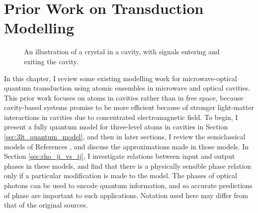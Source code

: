 \chapter{\label{ch:prior_transduction}Prior Work on Transduction Modelling}

\begin{figure}[h]
\centering
{}
\caption{\label{fig:3lt_diagram} An illustration of a crystal in a cavity, with signals entering and exiting the cavity.}
\end{figure}

\noindent In this chapter, I review some existing modelling work\cite{williamson_2014,fernandez-gonzalvo_2019,barnett_longdell_2020} for microwave-optical quantum transduction using atomic ensembles in microwave and optical cavities. This prior work focuses on atoms in cavities rather than in free space, because cavity-based systems promise to be more efficient because of stronger light-matter interactions in cavities due to concentrated electromagnetic field. To begin, I present a fully quantum model for three-level atoms in cavities in Section \ref{sec:3lt_quantum_model}, and then in later sections, I review the semiclassical models of References \cite{williamson_2014,fernandez-gonzalvo_2019,barnett_longdell_2020}, and discuss the approximations made in those models. In Section \ref{sec:rho_ji_vs_ij}, I investigate relations between input and output phases in these models, and find that there is a physically sensible phase relation only if a particular modification is made to the model. The phases of optical photons can be used to encode quantum information, and so accurate predictions of phase are important to such applications. Notation used here may differ from that of the original sources.

